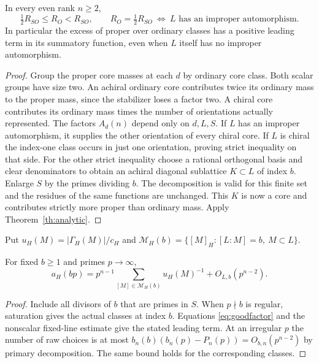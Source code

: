 \begin{theorem}\label{th:orientation}
In every even rank $n\ge2$,
\[
 \tfrac12 R_{SO}\le R_O<R_{SO},\qquad
 R_O=\tfrac12 R_{SO}\ \Longleftrightarrow\ L\text{ has an improper automorphism}.
\]
In particular the excess of proper over ordinary classes has a positive leading term in its summatory function, even when $L$ itself has no improper automorphism.
\end{theorem}
\begin{proof}
Group the proper core masses at each $d$ by ordinary core class. Both scalar groups have size two. An achiral ordinary core contributes twice its ordinary mass to the proper mass, since the stabilizer loses a factor two. A chiral core contributes its ordinary mass times the number of orientations actually represented. The factors $A_d(n)$ depend only on $d,L,S$. If $L$ has an improper automorphism, it supplies the other orientation of every chiral core. If $L$ is chiral the index-one class occurs in just one orientation, proving strict inequality on that side. For the other strict inequality choose a rational orthogonal basis and clear denominators to obtain an achiral diagonal sublattice $K\subset L$ of index $b$. Enlarge $S$ by the primes dividing $b$. The decomposition is valid for this finite set and the residues of the same functions are unchanged. This $K$ is now a core and contributes strictly more proper than ordinary mass. Apply Theorem~\ref{th:analytic}.
\end{proof}

Put $u_H(M)=|\Gamma_H(M)|/c_H$ and $\mathcal M_H(b)=\{[M]_H:[L:M]=b,\ M\subset L\}$.
\begin{lemma}\label{lem:pr}
For fixed $b\ge1$ and primes $p\to\infty$,
\[
 a_H(bp)=p^{n-1}\sum_{[M]\in\mathcal M_H(b)}u_H(M)^{-1}+O_{L,b}(p^{n-2}).
\]
\end{lemma}
\begin{proof}
Include all divisors of $b$ that are primes in $S$. When $p\nmid b$ is regular, saturation gives the actual classes at index $b$. Equations \eqref{eq:goodfactor} and the nonscalar fixed-line estimate give the stated leading term. At an irregular $p$ the number of raw choices is at most $b_n(b)(b_n(p)-P_n(p))=O_{b,n}(p^{n-2})$ by primary decomposition. The same bound holds for the corresponding classes.
\end{proof}

